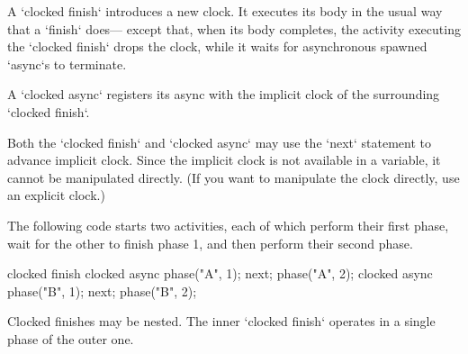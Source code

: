 A \xcd`clocked finish` introduces a new clock.  It executes its body in the
usual way that a \xcd`finish` does--- except that, when its body completes,
the activity executing the \xcd`clocked finish` drops the clock, while it
waits for asynchronous spawned \xcd`async`s to terminate.  

A \xcd`clocked async` registers its async with the implicit clock of
the surrounding \xcd`clocked finish`.   

Both the \xcd`clocked finish` and \xcd`clocked async` may use the \xcd`next`
statement to advance implicit clock.  Since the implicit clock is not
available in a variable, it cannot be manipulated directly. (If you want to
manipulate the clock directly, use an explicit clock.)

The following code starts two activities, each of which perform their first
phase, wait for the other to finish phase 1, and then perform their second
phase.  
\begin{xten}
clocked finish {
  clocked async {
     phase("A", 1);
     next;
     phase("A", 2);
  }
  clocked async {
     phase("B", 1);
     next;
     phase("B", 2);
  }
}
\end{xten}



Clocked finishes may be nested.  The inner \xcd`clocked finish` operates in a
single phase of the outer one.  

